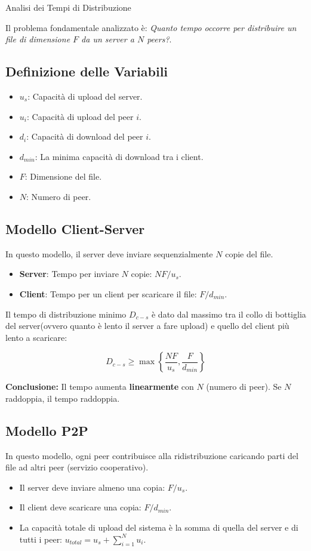 \documentclass[a4paper,12pt]{report}
\begin{document}
\begin{esempiobox}{Analisi dei Tempi di Distribuzione}

Il problema fondamentale analizzato è: \textit{Quanto tempo occorre per distribuire un file di dimensione $F$ da un server a $N$ peers?}.

\subsection*{Definizione delle Variabili}
\begin{itemize}
    \item $u_s$: Capacità di upload del server.
    \item $u_i$: Capacità di upload del peer $i$.
    \item $d_i$: Capacità di download del peer $i$.
    \item $d_{min}$: La minima capacità di download tra i client.
    \item $F$: Dimensione del file.
    \item $N$: Numero di peer.
\end{itemize}

\subsection*{Modello Client-Server}
In questo modello, il server deve inviare sequenzialmente $N$ copie del file.
\begin{itemize}
    \item \textbf{Server}: Tempo per inviare $N$ copie: $NF / u_s$.
    \item \textbf{Client}: Tempo per un client per scaricare il file: $F / d_{min}$.
\end{itemize}

Il tempo di distribuzione minimo $D_{c-s}$ è dato dal massimo tra il collo di bottiglia del server(ovvero quanto è lento il server a fare upload) e quello del client più lento a scaricare:

\begin{equation}
D_{c-s} \ge \max \left\{ \frac{NF}{u_s}, \frac{F}{d_{min}} \right\}
\end{equation}

\textbf{Conclusione:} Il tempo aumenta \textbf{linearmente} con $N$ (numero di peer). Se $N$ raddoppia, il tempo raddoppia.

\newpage
\subsection*{Modello P2P}
In questo modello, ogni peer contribuisce alla ridistribuzione caricando parti del file ad altri peer (servizio cooperativo).
\begin{itemize}
    \item Il server deve inviare almeno una copia: $F / u_s$.
    \item Il client deve scaricare una copia: $F / d_{min}$.
    \item La capacità totale di upload del sistema è la somma di quella del server e di tutti i peer: $u_{total} = u_s + \sum_{i=1}^{N} u_i$.
\end{itemize}


\end{esempiobox}
\end{document}
